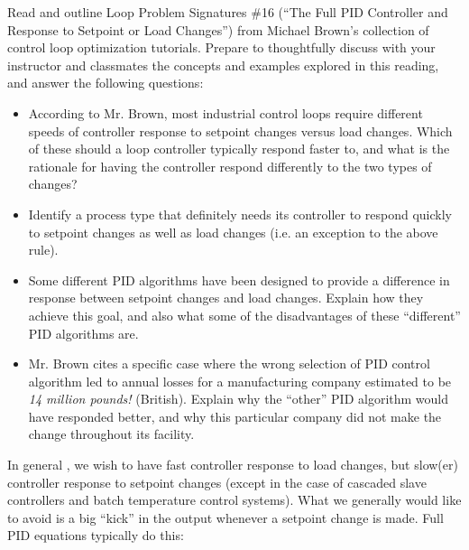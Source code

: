 

Read and outline Loop Problem Signatures \#16 (``The Full PID Controller and Response to Setpoint or Load Changes'') from Michael Brown's collection of control loop optimization tutorials.  Prepare to thoughtfully discuss with your instructor and classmates the concepts and examples explored in this reading, and answer the following questions:

\begin{itemize}
\item{} According to Mr. Brown, most industrial control loops require different speeds of controller response to setpoint changes versus load changes.  Which of these should a loop controller typically respond faster to, and what is the rationale for having the controller respond differently to the two types of changes?
\vskip 10pt
\item{} Identify a process type that definitely needs its controller to respond quickly to setpoint changes as well as load changes (i.e. an exception to the above rule).
\vskip 10pt
\item{} Some different PID algorithms have been designed to provide a difference in response between setpoint changes and load changes.  Explain how they achieve this goal, and also what some of the disadvantages of these ``different'' PID algorithms are.
\vskip 10pt
\item{} Mr. Brown cites a specific case where the wrong selection of PID control algorithm led to annual losses for a manufacturing company estimated to be {\it 14 million pounds!} (British).  Explain why the ``other'' PID algorithm would have responded better, and why this particular company did not make the change throughout its facility.
\end{itemize}














In general , we wish to have fast controller response to load changes, but slow(er) controller response to setpoint changes (except in the case of cascaded slave controllers and batch temperature control systems).  What we generally would like to avoid is a big ``kick'' in the output whenever a setpoint change is made.  Full PID equations typically do this:

